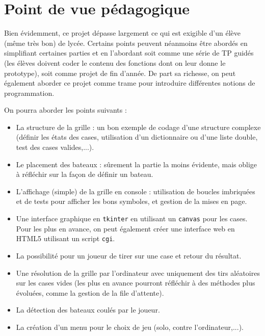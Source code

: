 \chapter{Point de vue pédagogique}

Bien évidemment, ce projet dépasse largement ce qui est exigible d'un élève (même très bon) de lycée. Certains points peuvent néanmoins être abordés en simplifiant certaines parties et en l'abordant soit comme une série de TP guidés (les élèves doivent coder le contenu des fonctions dont on leur donne le prototype), soit comme projet de fin d'année. De part sa richesse, on peut également aborder ce projet comme trame pour introduire différentes notions de programmation. 

On pourra aborder les points suivants :
\begin{itemize}
\item La structure de la grille : un bon exemple de codage d'une structure complexe (définir les états des cases, utilisation d'un dictionnaire ou d'une liste double, test des cases valides,...).
\item Le placement des bateaux : sûrement la partie la moins évidente, mais oblige à réfléchir sur la façon de définir un bateau.
\item L'affichage (simple) de la grille en console : utilisation de boucles imbriquées et de tests pour afficher les bons symboles, et gestion de la mises en page.
\item Une interface graphique en \texttt{tkinter} en utilisant un \texttt{canvas} pour les cases. Pour les plus en avance, on peut également créer une interface web en HTML5 utilisant un script \texttt{cgi}.
\item La possibilité pour un joueur de tirer sur une case et retour du résultat.
\item Une résolution de la grille par l'ordinateur avec uniquement des tirs aléatoires sur les cases vides (les plus en avance pourront réfléchir à des méthodes plus évoluées, comme la gestion de la file d'attente).
\item La détection des bateaux coulés par le joueur.
\item La création d'un menu pour le choix de jeu (solo, contre l'ordinateur,...).
\end{itemize}

\medskip

